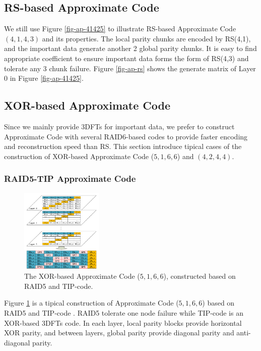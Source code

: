 \documentclass[sigconf]{acmart}
\begin{document}
\subsection{RS-based Approximate Code}
We still use Figure \ref{fig-ap-41425} to illustrate RS-based Approximate Code $(4,1,4,3)$ and its properties. The local parity chunks are encoded by RS(4,1), and the important data generate another 2 global parity chunks. It is easy to find appropriate coefficient to ensure important data forms the form of RS(4,3) and tolerate any 3 chunk failure. Figure \ref{fig-ap-rs} shows the generate matrix of Layer 0 in Figure \ref{fig-ap-41425}.

\subsection{XOR-based Approximate Code}
Since we mainly provide 3DFTs for important data, we prefer to construct Approximate Code with several RAID6-based codes to provide faster encoding and reconstruction speed than RS. This section introduce tipical cases of the construction of XOR-based Approximate Code ($5,1,6,6$) and $(4,2,4,4)$.

\subsubsection{RAID5-TIP Approximate Code}
\begin{figure}[h]
\centering
\includegraphics[width=0.35\textwidth]{photo/AP-TIP-v2.pdf}
\caption{The XOR-based Approximate Code ($5,1,6,6$), constructed based on RAID5 and TIP-code.}
\label{fig-ap-TIP}
\end{figure}

Figure \ref{fig-ap-TIP} is a tipical construction of Approximate Code ($5,1,6,6$) based on RAID5 and TIP-code \cite{zhang2015tip}. RAID5 tolerate one node failure while TIP-code is an XOR-based 3DFTs code. In each layer, local parity blocks provide horizontal XOR parity, and between layers, global parity provide diagonal parity and anti-diagonal parity. 
\end{document}
